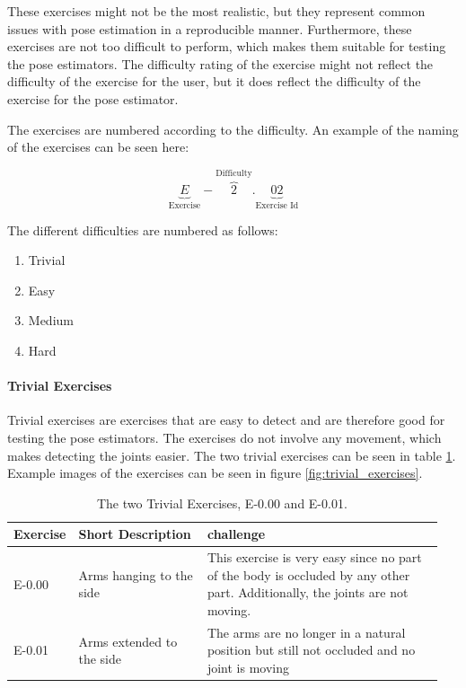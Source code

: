 These exercises might not be the most realistic, but they represent common issues with pose estimation in a reproducible manner. Furthermore, these exercises are not too difficult to perform, which makes them suitable for testing the pose estimators. The difficulty rating of the exercise might not reflect the difficulty of the exercise for the user, but it does reflect the difficulty of the exercise for the pose estimator.

The exercises are numbered according to the difficulty. An example of the naming of the exercises can be seen here:

\[
    \underbrace{E}_\text{Exercise}-\overbrace{2}^\text{Difficulty}.\underbrace{02}_\text{Exercise Id}
\]

The different difficulties are numbered as follows:

\begin{enumerate}
    \addtocounter{enumi}{-1}
    \item Trivial
    \item Easy
    \item Medium
    \item Hard
\end{enumerate}

\paragraph{Trivial Exercises}

Trivial exercises are exercises that are easy to detect and are therefore good for testing the pose estimators. The exercises do not involve any movement, which makes detecting the joints easier. The two trivial exercises can be seen in table \ref{tab:trivial_exercises}. Example images of the exercises can be seen in figure \ref{fig:trivial_exercises}.

\begin{table}[ht]
  \caption[Trivial Exercises]{The two Trivial Exercises, E-0.00 and E-0.01.}
  \label{tab:trivial_exercises}
  \begin{tabular}{p{0.1\linewidth}p{0.3\linewidth}p{0.55\linewidth}}
  \hline
  Exercise & Short Description         & challenge   \\ \hline
  E-0.00   & Arms hanging to the side  & This exercise is very easy since no part of the body is occluded by any other part. Additionally, the joints are not moving. \\
  E-0.01   & Arms extended to the side & The arms are no longer in a natural position but still not occluded and no joint is moving \\ \hline
  \end{tabular}
\end{table} 

